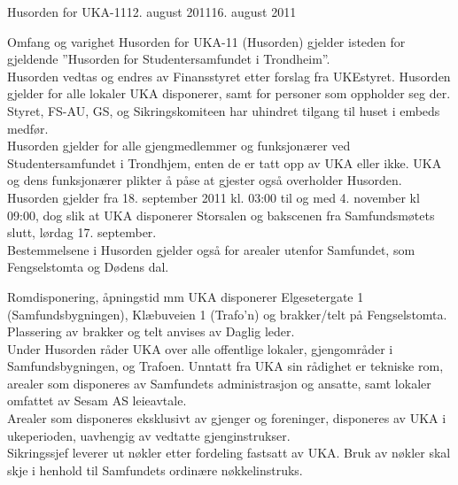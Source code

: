 \begin{instruks}{Husorden for UKA-11}{12. august 2011}{16. august 2011}



\begin{instruksledd}{Omfang og varighet}
Husorden for UKA-11 (Husorden) gjelder isteden for gjeldende ”Husorden for
Studentersamfundet i Trondheim”.\\

Husorden vedtas og endres av Finansstyret etter forslag fra UKEstyret. Husorden
gjelder for alle lokaler UKA disponerer, samt for personer som oppholder seg der.
Styret, FS-AU, GS, og Sikringskomiteen har uhindret tilgang til huset i embeds medfør.\\

Husorden gjelder for alle gjengmedlemmer og funksjonærer ved
Studentersamfundet i Trondhjem, enten de er tatt opp av UKA eller ikke. UKA og
dens funksjonærer plikter å påse at gjester også overholder Husorden.\\

Husorden gjelder fra 18. september 2011 kl. 03:00 til og med 4. november kl
09:00, dog slik at UKA disponerer Storsalen og bakscenen fra Samfundsmøtets
slutt, lørdag 17. september.\\

Bestemmelsene i Husorden gjelder også for arealer utenfor Samfundet, som
Fengselstomta og Dødens dal.
\end{instruksledd}

\begin{instruksledd}{Romdisponering, åpningstid mm}
UKA disponerer Elgesetergate 1 (Samfundsbygningen), Klæbuveien 1 (Trafo’n)
og brakker/telt på Fengselstomta. Plassering av brakker og telt anvises av
Daglig leder.\\

Under Husorden råder UKA over alle offentlige lokaler, gjengområder i
Samfundsbygningen, og Trafoen. Unntatt fra UKA sin rådighet er tekniske rom,
arealer som disponeres av Samfundets administrasjon og ansatte, samt lokaler
omfattet av Sesam AS leieavtale.\\

Arealer som disponeres eksklusivt av gjenger og foreninger, disponeres av UKA i
ukeperioden, uavhengig av vedtatte gjenginstrukser.\\

Sikringssjef leverer ut nøkler etter fordeling fastsatt av UKA. Bruk av nøkler skal
skje i henhold til Samfundets ordinære nøkkelinstruks.\\


\end{instruksledd}
\end{instruks}
